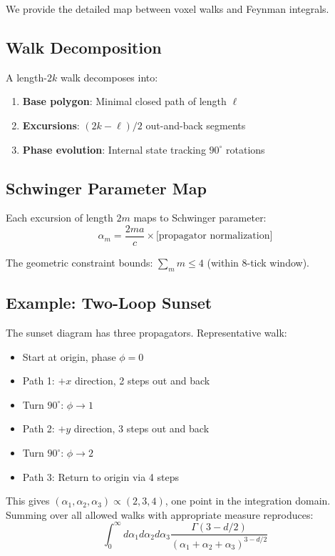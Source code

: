 \documentclass[11pt,a4paper]{article}
\theoremstyle{definition}
\theoremstyle{remark}
\begin{document}
We provide the detailed map between voxel walks and Feynman integrals.

\subsection{Walk Decomposition}

A length-$2k$ walk decomposes into:
\begin{enumerate}
\item \textbf{Base polygon}: Minimal closed path of length $\ell$
\item \textbf{Excursions}: $(2k-\ell)/2$ out-and-back segments
\item \textbf{Phase evolution}: Internal state tracking $90^\circ$ rotations
\end{enumerate}

\subsection{Schwinger Parameter Map}

Each excursion of length $2m$ maps to Schwinger parameter:
\[
\alpha_m = \frac{2ma}{c} \times \text{[propagator normalization]}
\]

The geometric constraint bounds: $\sum_m m \leq 4$ (within 8-tick window).

\subsection{Example: Two-Loop Sunset}

The sunset diagram has three propagators. Representative walk:
\begin{itemize}
\item Start at origin, phase $\phi = 0$
\item Path 1: $+x$ direction, 2 steps out and back
\item Turn $90^\circ$: $\phi \to 1$
\item Path 2: $+y$ direction, 3 steps out and back
\item Turn $90^\circ$: $\phi \to 2$
\item Path 3: Return to origin via 4 steps
\end{itemize}

This gives $(\alpha_1, \alpha_2, \alpha_3) \propto (2, 3, 4)$, one point in the integration domain. Summing over all allowed walks with appropriate measure reproduces:
\[
\int_0^\infty d\alpha_1 d\alpha_2 d\alpha_3 \frac{\Gamma(3-d/2)}{(\alpha_1+\alpha_2+\alpha_3)^{3-d/2}}
\]
\end{document}
